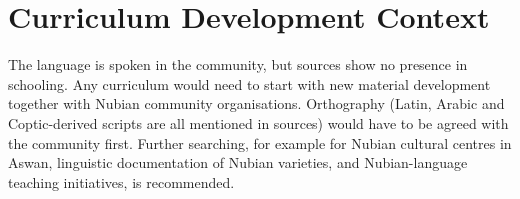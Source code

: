 \documentclass[12pt]{article}
\begin{document}
\section{Curriculum Development Context}
The language is spoken in the community, but sources show no presence in schooling. Any curriculum would need to start with new material development together with Nubian community organisations. Orthography (Latin, Arabic and Coptic-derived scripts are all mentioned in sources) would have to be agreed with the community first. Further searching, for example for Nubian cultural centres in Aswan, linguistic documentation of Nubian varieties, and Nubian-language teaching initiatives, is recommended.
\end{document}

